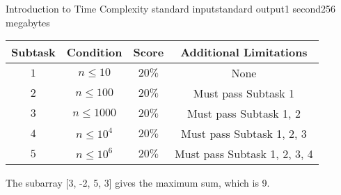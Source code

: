 \begin{problem}{Introduction to Time Complexity }{standard input}{standard output}{1 second}{256 megabytes}
\begin{center}
  \begin{tabular}{ | c | c | c | c | } \hline
    \bf{Subtask} &
    \bf{Condition} &
    \bf{Score} &
    \bf{Additional Limitations} \\ \hline
    $1$ & $n \le 10$ & $20\%$ & None \\ \hline
    $2$ & $n \le 100$ & $20\%$ & Must pass Subtask 1 \\ \hline
    $3$ & $n \le 1000$ & $20\%$ & Must pass Subtask 1, 2 \\ \hline
    $4$ & $n \le 10^4$ & $20\%$ & Must pass Subtask 1, 2, 3 \\ \hline
    $5$ & $n \le 10^6$ & $20\%$ & Must pass Subtask 1, 2, 3, 4 \\ \hline
    \end{tabular}
\end{center}

\Example

\begin{example}
%
\end{example}

\Note
The subarray [3, -2, 5, 3] gives the maximum sum, which is 9. 

\end{problem}

